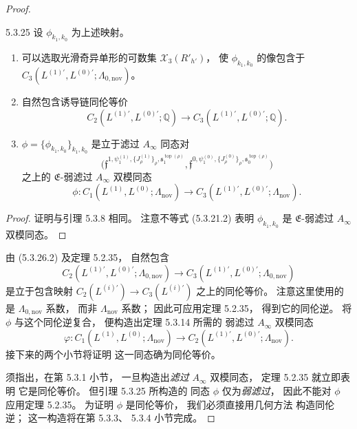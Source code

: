 \begin{proof}
\begin{lemma}{5.3.25}\label{lem:5-3-25}
设 $\phi_{k_1,k_0}$
为上述映射。
\begin{enumerate}[
 label=\textup{(5.3.26.\arabic*)},
 leftmargin=6.3em]
\item\label{cond:5-3-26-1}
可以选取光滑奇异单形的可数集
$\mathcal X_3(R'_{h'})$，
使 $\phi_{k_1,k_0}$ 的像包含于
$C_3(L^{(1)\prime},L^{(0)\prime};
\Lambda_{0,\mathrm{nov}})$。
\item\label{cond:5-3-26-2}
自然包含诱导链同伦等价
\[
C_2(L^{(1)\prime},L^{(0)\prime};\mathbb Q)
\longrightarrow
C_3(L^{(1)\prime},L^{(0)\prime};\mathbb Q).
\]
\item\label{cond:5-3-26-3}
$\phi=\{\phi_{k_1,k_0}\}_{k_1,k_0}$
是立于滤过 $A_\infty$ 同态对
\[
\bigl(
\mathfrak f^{1,\psi^{(1)}_1,
\{J^{(1)}_\rho\}_\rho,
\mathfrak s_1^{\operatorname{top}(\rho)}},
\mathfrak f^{0,\psi^{(0)}_1,
\{J^{(0)}_\rho\}_\rho,
\mathfrak s_0^{\operatorname{top}(\rho)}}
\bigr)
\]
之上的 $\mathfrak E$-弱滤过
$A_\infty$ 双模同态
\[
\phi\colon
C_1(L^{(1)},L^{(0)};\Lambda_{\mathrm{nov}})
\longrightarrow
C_3(L^{(1)\prime},L^{(0)\prime};
\Lambda_{\mathrm{nov}}).
\]
\end{enumerate}
\end{lemma}
\begin{proof}
证明与引理 5.3.8 相同。
注意不等式 (5.3.21.2)
表明 $\phi_{k_1,k_0}$
是 $\mathfrak E$-弱滤过
$A_\infty$ 双模同态。
\end{proof}

由 (5.3.26.2) 及定理 5.2.35，
自然包含
\[
C_2(L^{(1)\prime},L^{(0)\prime};
\Lambda_{0,\mathrm{nov}})
\longrightarrow
C_3(L^{(1)\prime},L^{(0)\prime};
\Lambda_{0,\mathrm{nov}})
\]
是立于包含映射
$C_2(L^{(i)\prime})
\to C_3(L^{(i)\prime})$
之上的同伦等价。
注意这里使用的是
$\Lambda_{0,\mathrm{nov}}$ 系数，
而非 $\Lambda_{\mathrm{nov}}$ 系数；
因此可应用定理 5.2.35，
得到它的同伦逆。
将 $\phi$ 与这个同伦逆复合，
便构造出定理 5.3.14 所需的
弱滤过 $A_\infty$ 双模同态
\[
\varphi\colon
C_1(L^{(1)},L^{(0)};\Lambda_{\mathrm{nov}})
\longrightarrow
C_2(L^{(1)\prime},L^{(0)\prime};
\Lambda_{\mathrm{nov}}).
\]
接下来的两个小节将证明
这一同态确为同伦等价。

须指出，在第 5.3.1 小节，
一旦构造出\emph{滤过}
$A_\infty$ 双模同态，
定理 5.2.35 就立即表明
它是同伦等价。
但引理 5.3.25 所构造的
同态 $\phi$ 仅为\emph{弱滤过}，
因此不能对 $\phi$
应用定理 5.2.35。
为证明 $\phi$ 是同伦等价，
我们必须直接用几何方法
构造同伦逆；
这一构造将在第 5.3.3、
5.3.4 小节完成。
\begingroup\renewcommand{\qedsymbol}{}\end{proof}\endgroup
